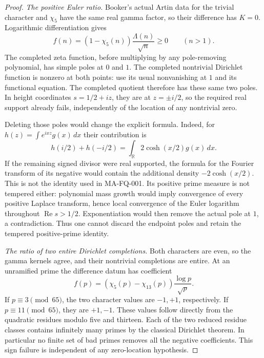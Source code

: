 \begin{proof}
\emph{The positive Euler ratio.}
Booker's actual Artin data for the trivial character and
$\chi_5$ have the same real gamma factor, so their difference
has $K=0$.  Logarithmic differentiation gives
\[
 f(n)=(1-\chi_5(n))\frac{\Lambda(n)}{\sqrt n}\ge0
                         \qquad(n>1).
 \tag{MA-FQ.30}
\]
The completed zeta function, before multiplying by any
pole-removing polynomial, has simple poles at $0$ and $1$.
The completed nontrivial Dirichlet function is nonzero at
both points: use its usual nonvanishing at $1$ and its
functional equation.  The completed quotient therefore
has these same two poles.  In height coordinates
$s=1/2+iz$, they are at $z=\pm i/2$, so the required real
support already fails, independently of the location of
any nontrivial zero.

Deleting those poles would change the explicit formula.
Indeed, for $h(z)=\int e^{ixz}g(x)\,dx$ their contribution is
\[
 h(i/2)+h(-i/2)=
                    \int_{\mathbb R}2\cosh(x/2)g(x)\,dx.
 \tag{MA-FQ.31}
\]
If the remaining signed divisor were real supported,
the formula for the Fourier transform of its negative
would contain the additional density $-2\cosh(x/2)$.
This is not the identity used in MA-FQ-001.
Its positive prime measure is not tempered either:
polynomial mass growth would imply convergence of every
positive Laplace transform, hence local convergence of
the Euler logarithm throughout $\operatorname{Re}s>1/2$.
Exponentiation would then remove the actual pole at $1$,
a contradiction.  Thus one cannot discard the endpoint
poles and retain the tempered positive-prime identity.

\emph{The ratio of two entire Dirichlet completions.}
Both characters are even, so the gamma kernels agree, and
their nontrivial completions are entire.  At an unramified
prime the difference datum has coefficient
\[
 f(p)=(\chi_5(p)-\chi_{13}(p))\frac{\log p}{\sqrt p}.
 \tag{MA-FQ.32}
\]
If $p\equiv3\pmod{65}$, the two character values are
$-1,+1$, respectively.  If $p\equiv11\pmod{65}$, they
are $+1,-1$.  These values follow directly from the
quadratic residues modulo five and thirteen.  Each of
the two reduced residue classes contains infinitely many
primes by the classical Dirichlet theorem.  In particular
no finite set of bad primes removes all the negative
coefficients.  This sign failure is independent of any
zero-location hypothesis.


\end{proof}
